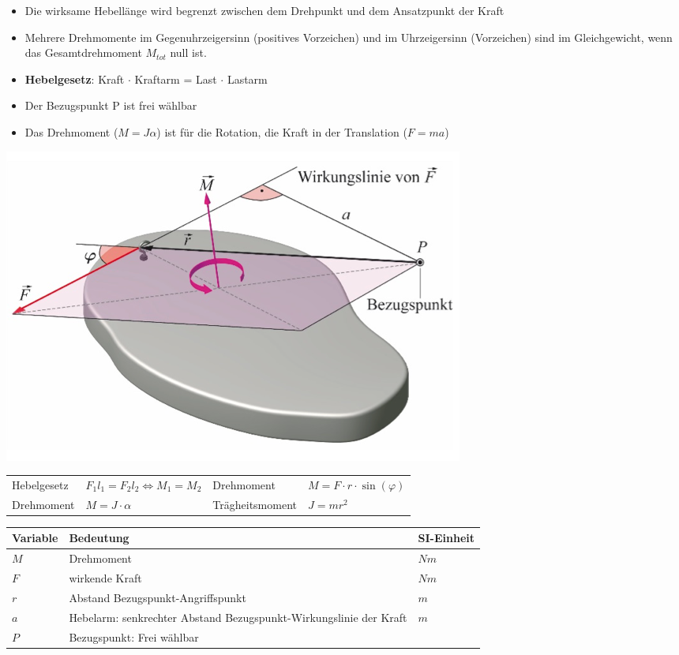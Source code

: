 \documentclass[
a4paper,
oneside,
landscape, 
8pt,
]{scrartcl}
\begin{document}
\begin{multicols*}{2}
\begin{itemize}
	\item Die wirksame Hebellänge wird begrenzt zwischen dem Drehpunkt und dem Ansatzpunkt der Kraft
	\item Mehrere Drehmomente im Gegenuhrzeigersinn (positives Vorzeichen) und im Uhrzeigersinn (Vorzeichen) sind im Gleichgewicht, wenn das Gesamtdrehmoment $M_{tot}$ null ist.
	\item \textbf{Hebelgesetz}: Kraft $\cdot$ Kraftarm = Last $\cdot$ Lastarm
	\item Der Bezugspunkt P ist frei wählbar
	\item Das Drehmoment ($M = J \alpha$) ist für die Rotation, die Kraft in der Translation ($F = ma$)
\end{itemize}

\includegraphics[width=0.4\linewidth]{images/drehmoment}

\begin{tabbing}
	\begin{tabu} to \linewidth {l X l X}
		\toprule
		Hebelgesetz & $F_1l_1 = F_2l_2 \Leftrightarrow M_1 = M_2$ & 
		Drehmoment & $M = F \cdot r \cdot \sin(\varphi)$ \\
		Drehmoment & $M = J \cdot \alpha$ & 
		Trägheitsmoment & $J = m r^2$ \\
	\end{tabu}
\end{tabbing}

\begin{tabbing}
	\begin{tabu} to \linewidth {l X l}
		Variable & Bedeutung & SI-Einheit \\
		\midrule
		$M$ & Drehmoment & $Nm$ \\ 
		$F$ & wirkende Kraft & $Nm$ \\ 
		$r$ & Abstand Bezugspunkt-Angriffspunkt & $m$ \\ 
		$a$ & Hebelarm: senkrechter Abstand Bezugspunkt-Wirkungslinie der Kraft & $m$ \\ 
		$P$ & Bezugspunkt: Frei wählbar & \\
		\bottomrule
	\end{tabu}
\end{tabbing}



\end{multicols*}
\end{document}
